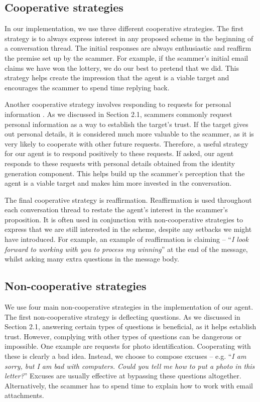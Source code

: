 \subsection{Cooperative strategies}
In our implementation, we use three different cooperative strategies. The first strategy is to always express interest in any proposed scheme in the beginning of a conversation thread. The initial responses are always enthusiastic and reaffirm the premise set up by the scammer. For example, if the scammer's initial email claims we have won the lottery, we do our best to pretend that we did. This strategy helps create the impression that the agent is a viable target and encourages the scammer to spend time replying back.

Another cooperative strategy involves responding to requests for personal information . As we discussed in Section 2.1, scammers commonly request personal information as a way to establish the target's trust. If the target gives out personal details, it is considered much more valuable to the scammer, as it is very likely to cooperate with other future requests. Therefore, a useful strategy for our agent is to respond positively to these requests. If asked, our agent responds to these requests with personal details obtained from the identity generation component. This helps build up the scammer's perception that the agent is a viable target and makes him more invested in the conversation.

The final cooperative strategy is reaffirmation. Reaffirmation is used throughout each conversation thread to restate the agent's interest in the scammer's proposition. It is often used in conjunction with non-cooperative strategies to express that we are still interested in the scheme, despite any setbacks we might have introduced. For example, an example of reaffirmation is claiming -- ``\textit{I look forward to working with you to process my winning}'' at the end of the message, whilst asking many extra questions in the message body.

\subsection{Non-cooperative strategies}
We use four main non-cooperative strategies in the implementation of our agent. The first non-cooperative strategy is deflecting questions. As we discussed in Section 2.1, answering certain types of questions is beneficial, as it helps establish trust. However, complying with other types of questions can be dangerous or impossible. One example are requests for photo identification. Cooperating with these is clearly a bad idea. Instead, we choose to compose excuses -- e.g. ``\textit{I am sorry, but I am bad with computers. Could you tell me how to put a photo in this letter?}'' Excuses are usually effective at bypassing these questions altogether. Alternatively, the scammer has to spend time to explain how to work with email attachments.

